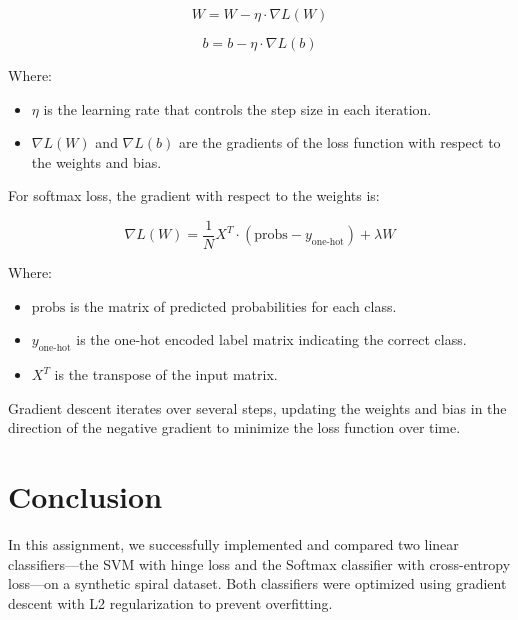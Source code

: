 \documentclass{article}
\begin{document}
\begin{equation}
W = W - \eta \cdot \nabla L(W)
\end{equation}

\begin{equation}
b = b - \eta \cdot \nabla L(b)
\end{equation}

Where:
\begin{itemize}
    \item $\eta$ is the learning rate that controls the step size in each iteration.
    \item $\nabla L(W)$ and $\nabla L(b)$ are the gradients of the loss function with respect to the weights and bias.
\end{itemize}

For softmax loss, the gradient with respect to the weights is:

\begin{equation}
\nabla L(W) = \frac{1}{N} X^T \cdot (\text{probs} - y_{\text{one-hot}}) + \lambda W
\end{equation}

Where:
\begin{itemize}
    \item $\text{probs}$ is the matrix of predicted probabilities for each class.
    \item $y_{\text{one-hot}}$ is the one-hot encoded label matrix indicating the correct class.
    \item $X^T$ is the transpose of the input matrix.
\end{itemize}

Gradient descent iterates over several steps, updating the weights and bias in the direction of the negative gradient to minimize the loss function over time.


\section{Conclusion}
In this assignment, we successfully implemented and compared two linear classifiers—the SVM with hinge loss and the Softmax classifier with cross-entropy loss—on a synthetic spiral dataset. Both classifiers were optimized using gradient descent with L2 regularization to prevent overfitting.
\end{document}
